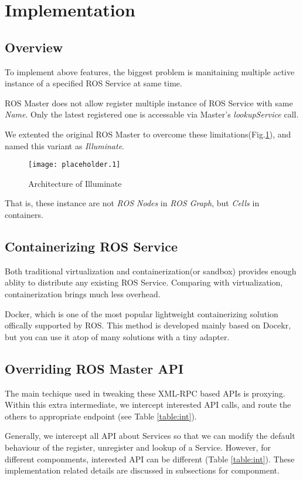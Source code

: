 \section{Implementation}

\subsection{Overview}
To implement above features, the biggest problem is manitaining multiple active instance of a specified ROS Service at same time.

ROS Master does not allow register multiple instance of ROS Service with same \emph{Name}.
Only the latest registered one is accessable via Master's \emph{lookupService} call.

We extented the original ROS Master to overcome these limitations(Fig.\ref{figure:illuminate}),
and named this variant as \emph{Illuminate}.

\begin{figure}[h]
\centering
\texttt{[image: placeholder.1]}
\caption{Architecture of Illuminate}
\label{figure:illuminate}
\end{figure}

That is, these instance are not \emph{ROS Nodes} in \emph{ROS Graph}, but \emph{Cells} in containers.

\subsection{Containerizing ROS Service}
Both traditional virtualization and containerization(or sandbox) provides enough ablity to distribute any existing ROS Service.
Comparing with virtualization, containerization brings much less overhead. %

Docker, which is one of the most popular lightweight containerizing solution offically supported by ROS.
This method is developed mainly based on Docekr, but you can use it atop of many solutions with a tiny adapter. 


\subsection{Overriding ROS Master API}
The main techique used in tweaking these XML-RPC based APIs is proxying.
Within this extra intermediate, we intercept interested API calls,
and route the others to appropriate endpoint (see Table \ref{table:int}).

Generally, we intercept all API about Services so that we can modify the default behaviour of the register,
unregister and lookup of a Service.
However, for different componments, interested API can be different (Table \ref{table:int}).
These implementation related details are discussed in subsections for componment.
 
